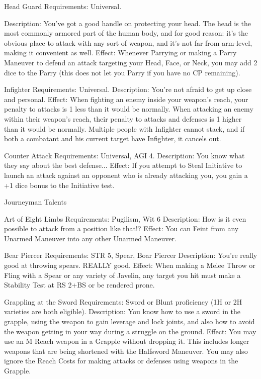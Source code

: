 \documentclass[oneside,11pt,english]{book}
\begin{document}
 

Head Guard 
Requirements: Universal. 


Description: You’ve got a good handle on protecting your head. The head is the most commonly 
armored part of the human body, and for good reason: it’s the obvious place to attack with any sort of 
weapon, and it’s not far from arm-level, making it convenient as well. 
Effect: Whenever Parrying or making a Parry Maneuver to defend an attack targeting your Head, Face, or 
Neck, you may add 2 dice to the Parry (this does not let you Parry if you have no CP remaining). 

 

Infighter 
Requirements: Universal. 
Description: You’re not afraid to get up close and personal. 
Effect: When fighting an enemy inside your weapon's reach, your penalty to attacks is 1 less than it 
would be normally. When attacking an enemy within their weapon’s reach, their penalty to attacks and 
defenses is 1 higher than it would be normally. Multiple people with Infighter cannot stack, and if both a 
combatant and his current target have Infighter, it cancels out. 

 

Counter Attack 
Requirements: Universal, AGI 4. 
Description: You know what they say about the best defense... 
Effect: If you attempt to Steal Initiative to launch an attack against an opponent who is already attacking 
you, you gain a +1 dice bonus to the Initiative test. 

 

Journeyman Talents 

 

Art of Eight Limbs 
Requirements: Pugilism, Wit 6 
Description: How is it even possible to attack from a position like that!? 
Effect: You can Feint from any Unarmed Maneuver into any other Unarmed Maneuver. 

 

Bear Piercer 
Requirements: STR 5, Spear, Boar Piercer 
Description: You’re really good at throwing spears. REALLY good. 
Effect: When making a Melee Throw or Fling with a Spear or any variety of Javelin, any target you hit 
must make a Stability Test at RS 2+BS or be rendered prone. 

 

Grappling at the Sword 
Requirements: Sword or Blunt proficiency (1H or 2H varieties are both eligible). 
Description: You know how to use a sword in the grapple, using the weapon to gain leverage and lock 
joints, and also how to avoid the weapon getting in your way during a struggle on the ground. 
Effect: You may use an M Reach weapon in a Grapple without dropping it. This includes longer weapons 
that are being shortened with the Halfsword Maneuver. You may also ignore the Reach Costs for making 
attacks or defenses using weapons in the Grapple. 
\end{document}
